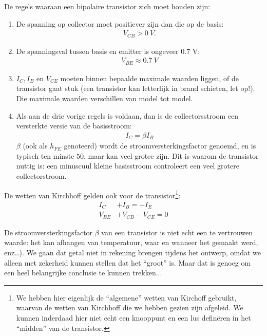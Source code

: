\documentclass{article}
\begin{document}
				De regels waaraan een bipolaire transistor zich moet houden zijn:
				\begin{enumerate}
					\item De spanning op collector moet positiever zijn dan die op de basis: 
					\begin{align}
					    V_{CB} > 0~V. 
					\end{align}

					\item De spanningsval tussen basis en emitter is ongeveer $0.7$ V: 
					\begin{align}
					    V_{BE} \approx 0.7~V
					\end{align}

					\item $I_C, I_B$ en $V_{CE} $ moeten binnen bepaalde maximale waarden liggen, of de transistor gaat stuk (een transistor kan letterlijk in brand schieten, let op!). Die maximale waarden verschillen van model tot model.

					\item Als aan de drie vorige regels is voldaan, dan is de collectorsstroom een versterkte versie van de basisstroom: 
					\begin{align}
					    I_C = \beta I_B
					    \label{eq:hfe}
					\end{align}
					$\beta$ (ook als $h_{FE}$ genoteerd) wordt de stroomversterkingsfactor genoemd, en is typisch ten minste $50$, maar kan veel grotee zijn. Dit is waarom de transistor nuttig is: een minuscuul kleine basisstroom controleert een veel grotere collectorstroom.

				\end{enumerate}

				De wetten van Kirchhoff gelden ook voor de transistor\footnote{We hebben hier eigenlijk de ``algemene'' wetten van Kirchoff gebruikt, waarvan de wetten van Kirchhoff die we hebben gezien zijn afgeleid. We kunnen inderdaad hier niet echt een knooppunt en een lus defin\"eren in het ``midden'' van de transistor.}:
				\begin{align}
				    I_C		&+ I_B = -I_E \\
				    V_{BE}  &+ V_{CB} - V_{CE} = 0
				\end{align}

				De stroomversterkingsfactor $\beta$ van een transistor is niet echt een te vertrouwen waarde: het kan afhangen van temperatuur, waar en wanneer het gemaakt werd, enz\ldots). We gaan dat getal niet in rekening brengen tijdens het ontwerp, omdat we alleen met zekerheid kunnen stellen dat het ``groot'' is. Maar dat is genoeg om een heel belangrijke conclusie te kunnen trekken...
\end{document}

